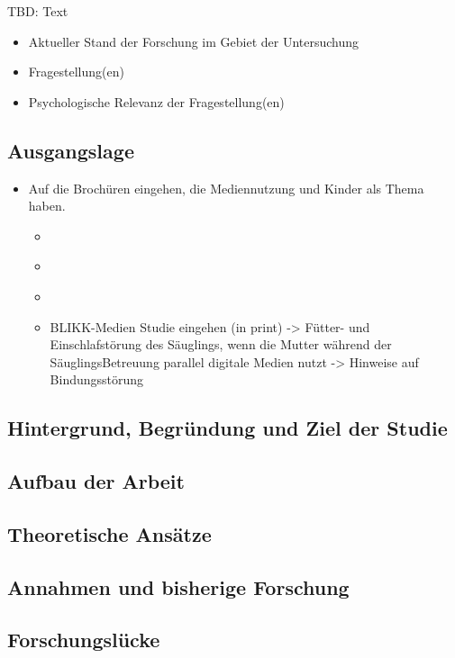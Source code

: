 TBD: Text

\begin{itemize}
    \item Aktueller Stand der Forschung im Gebiet der Untersuchung
    \item Fragestellung(en)
    \item Psychologische Relevanz der Fragestellung(en)
\end{itemize}

\subsection{Ausgangslage}
\begin{itemize}
    \item Auf die Brochüren eingehen, die Mediennutzung und Kinder als Thema haben.
    \begin{itemize}
        \item \cite{Weber2017}
        \item \cite{MariaLuisaNuesch2017}
        \item \cite{Elternbildung2017}
        \item BLIKK-Medien Studie eingehen (in print) -> Fütter- und Einschlafstörung des Säuglings, wenn die Mutter während der SäuglingsBetreuung parallel digitale Medien nutzt -> Hinweise auf Bindungsstörung
    \end{itemize}
\end{itemize}


\subsection{Hintergrund, Begründung und Ziel der Studie}
\subsection{Aufbau der Arbeit}
\subsection{Theoretische Ansätze}
\subsection{Annahmen und bisherige Forschung}
\subsection{Forschungslücke}

